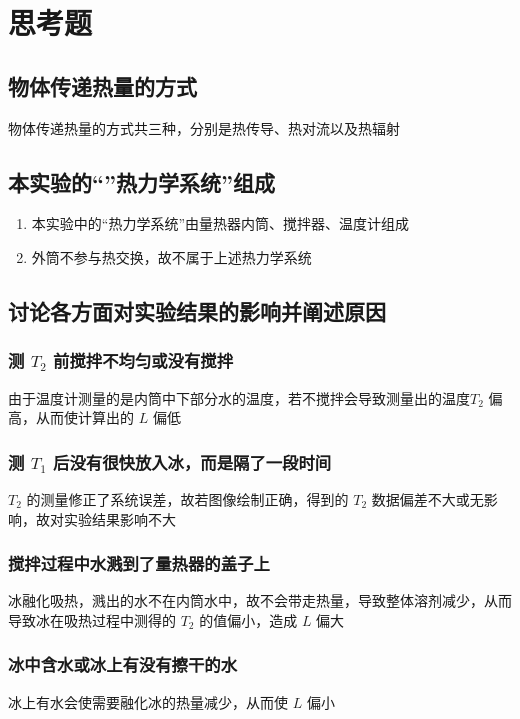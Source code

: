\documentclass[UTF8]{ctexart}
\begin{document}
\newpage
\section{思考题}
\subsection{物体传递热量的方式}
物体传递热量的方式共三种，分别是热传导、热对流以及热辐射

\subsection{本实验的“”热力学系统”组成}
\begin{enumerate}
    \item 本实验中的“热力学系统”由量热器内筒、搅拌器、温度计组成
    \item 外筒不参与热交换，故不属于上述热力学系统
\end{enumerate}

\subsection{讨论各方面对实验结果的影响并阐述原因}
\subsubsection{测 $T_2$ 前搅拌不均匀或没有搅拌}
由于温度计测量的是内筒中下部分水的温度，若不搅拌会导致测量出的温度$T_2$ 偏高，从而使计算出的 $L$ 偏低
\subsubsection{测 $T_1$ 后没有很快放入冰，而是隔了一段时间}
$T_2$ 的测量修正了系统误差，故若图像绘制正确，得到的 $T_2$ 数据偏差不大或无影响，故对实验结果影响不大
\subsubsection{搅拌过程中水溅到了量热器的盖子上}
冰融化吸热，溅出的水不在内筒水中，故不会带走热量，导致整体溶剂减少，从而导致冰在吸热过程中测得的 $T_2$ 的值偏小，造成 $L$ 偏大

\subsubsection{冰中含水或冰上有没有擦干的水}
冰上有水会使需要融化冰的热量减少，从而使 $L$ 偏小
\end{document}
